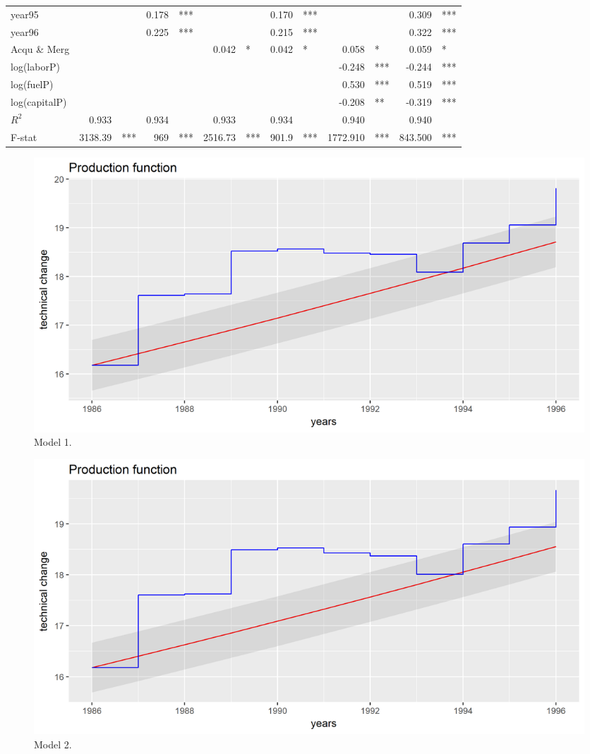 \documentclass[a4paper]{article}
\begin{document}
\begin{table}[H]
\begin{tabular}{lrlrlrlrlrlrl}
    year95 &       &       & 0.178 & ***   &       &       & 0.170 & ***   &       &       & 0.309 & *** \\
    year96 &       &       & 0.225 & ***   &       &       & 0.215 & ***   &       &       & 0.322 & *** \\
    Acqu \& Merg &       &       &       &       & 0.042 & *     & 0.042 & *     & 0.058 & *     & 0.059 & * \\
    log(laborP) &       &       &       &       &       &       &       &       & -0.248 & ***   & -0.244 & *** \\
    log(fuelP) &       &       &       &       &       &       &       &       & 0.530 & ***   & 0.519 & *** \\
    log(capitalP) &       &       &       &       &       &       &       &       & -0.208 & **    & -0.319 & *** \\ \hline
    $R^2$     & 0.933 &       & 0.934 &       & 0.933 &       & 0.934 &       & 0.940 &       & 0.940 &  \\
    F-stat     & 3138.39 & ***   & 969   & ***   & 2516.73 & ***   & 901.9 & ***   & 1772.910 & ***   & 843.500 & *** \\ \hline
    \end{tabular}%
  \label{tab:addlabel}%
\end{table}%


\newpage


\begin{figure}[H]
\caption{Model 1.}
\includegraphics[scale=.70]{Prod_ols}
\end{figure}

\begin{figure}[H]
\caption{Model 2.}
\includegraphics[scale=.70]{Prod_ols_model2}
\end{figure}
\end{document}
